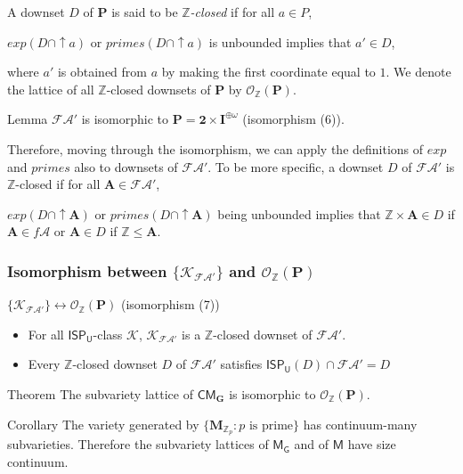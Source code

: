 \documentclass[professionalfont, handout, 10pt]{beamer} %
\theoremstyle{plain}
\theoremstyle{definition}
\newcommand{\m}[1]{{\mathbf {#1} }}
\newcommand{\bb}[1]{\mathbb {#1}}
\begin{document}
\begin{frame}
A downset $D$ of $\m{P}$ is said to be \emph{$\bb{Z}$-closed} if for all $a \in P$, 
\begin{center}
$exp(D \cap {\uparrow} a)$ or $primes(D \cap {\uparrow} a)$ is unbounded implies that $a' \in D$,
\end{center}
where $a'$ is obtained from $a$ by making the first coordinate equal to $1$.
We denote the lattice of all $\bb{Z}$-closed downsets of $\m{P}$ by $\mathcal{O}_{\bb{Z}}(\m{P})$.\pause

\begin{block}{Lemma}
    $\mathcal{FA}'$ is isomorphic to $\m P = \m 2 \times \m I^{\oplus \omega}$ (isomorphism (6)).
\end{block}
\pause

Therefore, moving through the isomorphism, we can apply the definitions of $exp$ and $primes$ also to downsets of $\mathcal{FA}'$.
To be more specific, a downset $D$ of $\mathcal{FA}'$ is $\bb{Z}$-closed if for all $\m A \in \mathcal{FA}'$,
\begin{center}
    $exp(D \cap {\uparrow} \m A)$ or $primes(D \cap {\uparrow} \m A)$ being unbounded implies that $\bb{Z} \times \m A \in D$ if $\m A \in f\mathcal{A}$ or $\m A \in D$ if $\bb{Z} \leq \m A$.
\end{center}
\end{frame}

\begin{frame}
\frametitle{Isomorphism between $\{\mathcal{K}_{\mathcal{FA}'}\}$ and $\mathcal{O}_{\bb{Z}}(\m P)$}

\begin{block}{$\{\mathcal{K}_{\mathcal{FA}'}\} \leftrightarrow \mathcal{O}_{\bb{Z}}(\m P)$ (isomorphism (7))}
\begin{itemize}
    \item For all $\mathsf{ISP_U}$-class $\mathcal{K}$, $\mathcal{K}_{\mathcal{FA}'}$ is a $\bb{Z}$-closed downset of $\mathcal{FA}'$.

    \item Every $\bb{Z}$-closed downset $D$ of $\mathcal{FA}'$ satisfies $\mathsf{ISP_U}(D) \cap \mathcal{FA}' = D$
\end{itemize}
\end{block}
\pause
\begin{block}{Theorem}
    The subvariety lattice of $\mathsf{CM}_{\mathbf{G}}$ is isomorphic to $\mathcal{O}_{\mathbb{Z}}(\m P)$.
\end{block}
\pause
\begin{block}{Corollary}
    The variety generated by $\{\m M_{\mathbb{Z}_p}: p \text{ is prime}\}$ has continuum-many subvarieties. 
    Therefore the subvariety lattices of $\mathsf{M_G}$ and of $\mathsf{M}$ have size continuum.
\end{block}

\end{frame}
\end{document}
